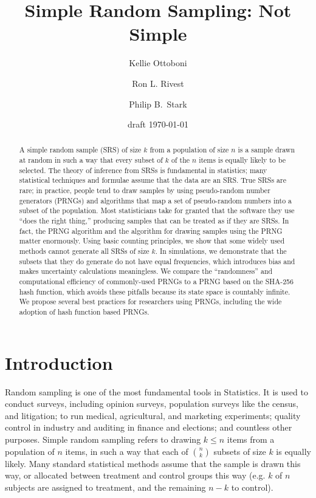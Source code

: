 \documentclass[12pt]{article}
\begin{document}
\title{Simple Random Sampling: Not Simple}
\author{Kellie Ottoboni
\and
Ron L. Rivest
\and
Philip B.~Stark 
}

\date{draft \today}




\maketitle

\begin{abstract}
\small
A simple random sample (SRS) of size $k$ from a population of size $n$ is a sample drawn 
at random in such a way that every subset of $k$ of the $n$ items is equally likely to be selected. 
The theory of inference from SRSs is fundamental in statistics;
many statistical techniques and formulae assume that the data are an SRS.
True SRSs are rare; in practice, people tend to draw samples by using pseudo-random number generators 
(PRNGs) and algorithms that map a set of pseudo-random numbers into a subset of the population. 
Most statisticians take for granted that the software they use ``does the right thing,''
producing samples that can be treated as if they are SRSs.
In fact, the PRNG algorithm and the algorithm for drawing samples using the PRNG matter
enormously.
Using basic counting principles, we show that some widely used methods cannot generate all SRSs of size $k$.
In simulations, we demonstrate that the subsets that they do generate do not have equal frequencies, which
introduces bias and makes uncertainty calculations meaningless.
We compare the ``randomness'' and computational efficiency of commonly-used PRNGs to a PRNG 
based on the SHA-256 hash function, which avoids these pitfalls because its state space is countably infinite.
We propose several best practices for researchers using PRNGs, including the wide adoption of hash function based PRNGs.
\end{abstract}


\newpage
\tableofcontents
\newpage 

\section{Introduction}
Random sampling is one of the most fundamental tools in Statistics.
It is used to conduct surveys, including opinion surveys, population surveys like the census, and litigation; 
to run medical, agricultural, and marketing experiments; 
quality control in industry and auditing in finance and elections;
and countless other purposes.
Simple random sampling refers to drawing $k \leq n$ items from a population of $n$ items,
in such a way that each of ${n \choose k}$ subsets of size $k$ is equally likely.
Many standard statistical methods assume that the sample is drawn this way, 
or allocated between treatment and control groups this way
(e.g. $k$ of $n$ subjects are assigned to treatment, and the remaining $n-k$ to control).
\end{document}
